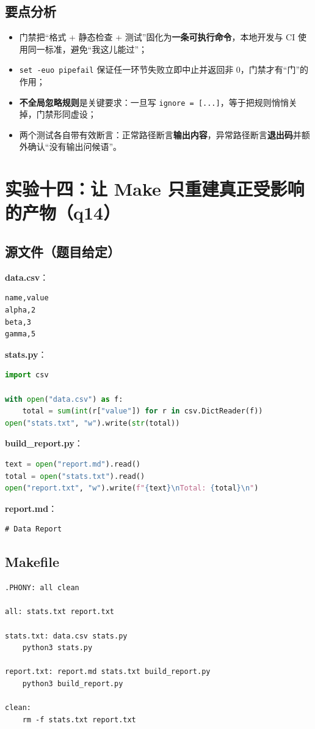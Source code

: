 \documentclass[UTF8,fontset=ubuntu]{ctexart}
\begin{document}
\subsection{要点分析}
\begin{itemize}
\item 门禁把“格式 + 静态检查 + 测试”固化为\textbf{一条可执行命令}，本地开发与 CI 使用同一标准，避免“我这儿能过”；
\item \lstinline|set -euo pipefail| 保证任一环节失败立即中止并返回非 0，门禁才有“门”的作用；
\item \textbf{不全局忽略规则}是关键要求：一旦写 \lstinline|ignore = [...]|，等于把规则悄悄关掉，门禁形同虚设；
\item 两个测试各自带有效断言：正常路径断言\textbf{输出内容}，异常路径断言\textbf{退出码}并额外确认“没有输出问候语”。
\end{itemize}

\section{实验十四：让 Make 只重建真正受影响的产物（q14）}

\subsection{源文件（题目给定）}
\textbf{data.csv}：
\begin{lstlisting}
name,value
alpha,2
beta,3
gamma,5
\end{lstlisting}

\textbf{stats.py}：
\begin{lstlisting}[language=Python]
import csv

with open("data.csv") as f:
    total = sum(int(r["value"]) for r in csv.DictReader(f))
open("stats.txt", "w").write(str(total))
\end{lstlisting}

\textbf{build\_report.py}：
\begin{lstlisting}[language=Python]
text = open("report.md").read()
total = open("stats.txt").read()
open("report.txt", "w").write(f"{text}\nTotal: {total}\n")
\end{lstlisting}

\textbf{report.md}：
\begin{lstlisting}
# Data Report
\end{lstlisting}

\subsection{Makefile}
\begin{lstlisting}
.PHONY: all clean

all: stats.txt report.txt

stats.txt: data.csv stats.py
	python3 stats.py

report.txt: report.md stats.txt build_report.py
	python3 build_report.py

clean:
	rm -f stats.txt report.txt
\end{lstlisting}
\end{document}
